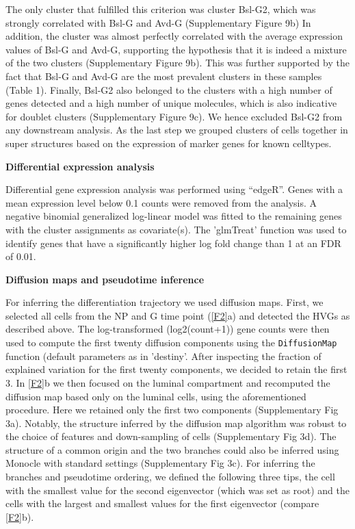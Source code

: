 \documentclass[titlepage, 12pt, oneside]{amsart}
\begin{document}
The only cluster that fulfilled this criterion was cluster Bsl-G2, which was strongly correlated with Bsl-G and Avd-G (Supplementary Figure 9b)
In addition, the cluster was almost perfectly correlated with the average expression values of Bsl-G and Avd-G, supporting the hypothesis that it is indeed a mixture of the two clusters (Supplementary Figure 9b).
This was further supported by the fact that Bsl-G and Avd-G are the most prevalent clusters in these samples (Table 1).
Finally, Bsl-G2 also belonged to the clusters with a high number of genes detected and a high number of unique molecules, which is also indicative for doublet clusters (Supplementary Figure 9c).
We hence excluded Bsl-G2 from any downstream analysis.
As the last step we grouped clusters of cells together in super structures based on the expression of marker genes for known celltypes.

\textbf{Differential expression analysis }

Differential gene expression analysis was performed using ``edgeR''\autocite{Robinson2010}.
Genes with a mean expression level below 0.1 counts were removed from the analysis.
A negative binomial generalized log-linear model was fitted to the remaining genes with the cluster assignments as covariate(s).
The 'glmTreat' function was used to identify genes that have a significantly higher log fold change than 1 at an FDR of 0.01.

\textbf{Diffusion maps and pseudotime inference}

For inferring the differentiation trajectory we used diffusion maps.
First, we selected all cells from the NP and G time point (\autoref{F2}a) and detected the HVGs as described above.
The log-transformed (log2(count+1)) gene counts were then used to compute the first twenty diffusion components using the \texttt{DiffusionMap} function (default parameters as in 'destiny'\autocite{Angerer2016}.
After inspecting the fraction of explained variation for the first twenty components, we decided to retain the first 3.
In \autoref{F2}b we then focused on the luminal compartment and recomputed the diffusion map based only on the luminal cells, using the aforementioned procedure.
Here we retained only the first two components (Supplementary Fig 3a).
Notably, the structure inferred by the diffusion map algorithm was robust to the choice of features and down-sampling of cells (Supplementary Fig 3d).
The structure of a common origin and the two branches could also be inferred using Monocle with standard settings\autocite{Trapnell2014} (Supplementary Fig 3c).
For inferring the branches and pseudotime ordering, we defined the following three tips, the cell with the smallest value for the second eigenvector (which was set as root) and the cells with the largest and smallest values for the first eigenvector (compare \autoref{F2}b).  
\end{document}
